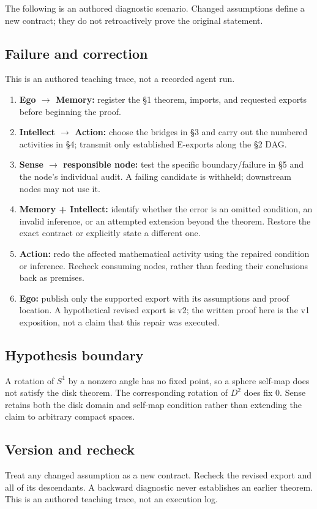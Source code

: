 \documentclass[preprint,12pt,aps,pra,showkeys,amsmath,amssymb,superscriptaddress,floatfix]{revtex4-2}
\theoremstyle{definition}
\theoremstyle{remark}
\providecommand{\tightlist}{\setlength{\itemsep}{2pt}\setlength{\parskip}{0pt}}
\begin{document}
The following is an authored diagnostic scenario. Changed assumptions
define a new contract; they do not retroactively prove the original
statement.

\subsection{Failure and correction}
This is an authored teaching trace, not a recorded agent run.

\begin{enumerate}
\def\labelenumi{\arabic{enumi}.}
\tightlist
\item
  \textbf{Ego \(\to\) Memory:} register the §1 theorem, imports, and
  requested exports before beginning the proof.
\item
  \textbf{Intellect \(\to\) Action:} choose the bridges in §3 and carry
  out the numbered activities in §4; transmit only established E-exports
  along the §2 DAG.
\item
  \textbf{Sense \(\to\) responsible node:} test the specific
  boundary/failure in §5 and the node's individual audit. A failing
  candidate is withheld; downstream nodes may not use it.
\item
  \textbf{Memory + Intellect:} identify whether the error is an omitted
  condition, an invalid inference, or an attempted extension beyond the
  theorem. Restore the exact contract or explicitly state a different
  one.
\item
  \textbf{Action:} redo the affected mathematical activity using the
  repaired condition or inference. Recheck consuming nodes, rather than
  feeding their conclusions back as premises.
\item
  \textbf{Ego:} publish only the supported export with its assumptions
  and proof location. A hypothetical revised export is v2; the written
  proof here is the v1 exposition, not a claim that this repair was
  executed.
\end{enumerate}

\subsection{Hypothesis boundary}
A rotation of \(S^{1}\) by a nonzero angle has no fixed point, so a
sphere self-map does not satisfy the disk theorem. The corresponding
rotation of \(D^{2}\) does fix 0. Sense retains both the disk domain and
self-map condition rather than extending the claim to arbitrary compact
spaces.

\subsection{Version and recheck}
Treat any changed assumption as a new contract. Recheck the revised
export and all of its descendants. A backward diagnostic never
establishes an earlier theorem. This is an authored teaching trace, not
an execution log.
\end{document}
